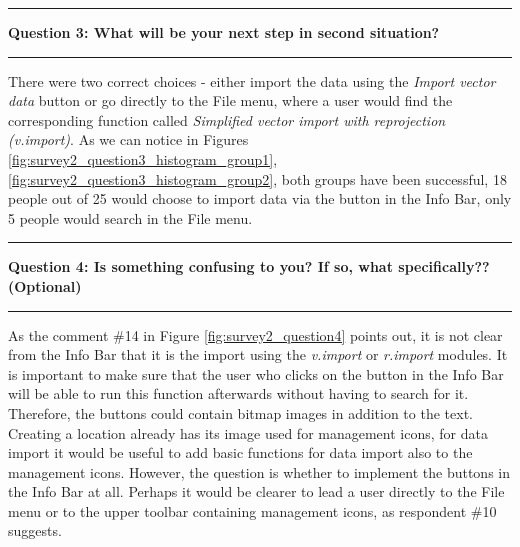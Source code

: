 \documentclass[a4paper,10pt,twoside]{article}
\begin{document}
\newpage
\vspace*{-1cm}
\par\noindent\rule{\textwidth}{0.4pt}
\noindent \textbf{Question 3: What will be your next step in second situation?}
\par\noindent\rule{\textwidth}{0.4pt}

\noindent There were two correct choices - either import the data
using the \textit{Import vector data} button or go directly to the
File menu, where a user would find the corresponding function called
\textit{Simplified vector import with reprojection (v.import)}. As we
can notice in Figures \ref{fig:survey2_question3_histogram_group1},
\ref{fig:survey2_question3_histogram_group2}, both groups have been
successful, 18 people out of 25 would choose to import data via the
button in the Info Bar, only 5 people would search in the File menu.

\par\noindent\rule{\textwidth}{0.4pt}
\noindent \textbf{Question 4: Is something confusing to you? If so, what specifically?? (Optional)}
\par\noindent\rule{\textwidth}{0.4pt}

\noindent As the comment \#14 in Figure \ref{fig:survey2_question4}
points out, it is not clear from the Info Bar that it is the import
using the \textit{v.import} or \textit{r.import} modules. It is
important to make sure that the user who clicks on the button in the
Info Bar will be able to run this function afterwards without having
to search for it. Therefore, the buttons could contain bitmap images
in addition to the text. Creating a location already has its image
used for management icons, for data import it would be useful to add
basic functions for data import also to the management icons. However,
the question is whether to implement the buttons in the Info Bar at
all. Perhaps it would be clearer to lead a user directly to the File
menu or to the upper toolbar containing management icons, as
respondent \#10 suggests.
\end{document}
